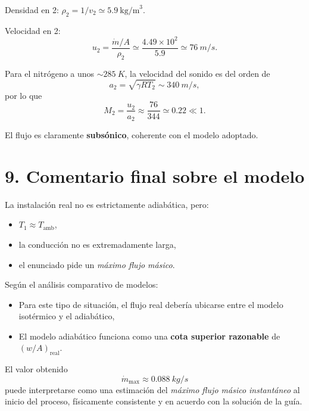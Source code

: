 \documentclass[11pt,a4paper]{article}
\begin{document}
Densidad en 2: $\rho_2 = 1/v_2 \simeq 5.9\ \text{kg/m}^3$.

Velocidad en 2:
\[
u_2 = \frac{\dot m/A}{\rho_2}
      \simeq \frac{4.49\times10^{2}}{5.9}
      \simeq \SI{76}{m/s}.
\]

Para el nitrógeno a unos $\sim \SI{285}{K}$, la velocidad del sonido es del orden de
\[
a_2 = \sqrt{\gamma R T_2} \sim \SI{340}{m/s},
\]
por lo que
\[
M_2 = \frac{u_2}{a_2} \approx \frac{76}{344}\simeq 0.22 \ll 1.
\]

El flujo es claramente \textbf{subsónico}, coherente con el modelo adoptado.

\section*{9. Comentario final sobre el modelo}

La instalación real no es estrictamente adiabática, pero:
\begin{itemize}
  \item $T_1 \approx T_{\text{amb}}$,
  \item la conducción no es extremadamente larga,
  \item el enunciado pide un \emph{máximo flujo másico}.
\end{itemize}

Según el análisis comparativo de modelos:
\begin{itemize}
  \item Para este tipo de situación, el flujo real debería ubicarse entre el modelo isotérmico y el adiabático,
  \item El modelo adiabático funciona como una \textbf{cota superior razonable} de $(w/A)_{\text{real}}$.
\end{itemize}

El valor obtenido
\[
\dot m_{\max} \approx \SI{0.088}{kg/s}
\]
puede interpretarse como una estimación del \emph{máximo flujo másico instantáneo} al inicio del proceso,
físicamente consistente y en acuerdo con la solución de la guía.
\end{document}

